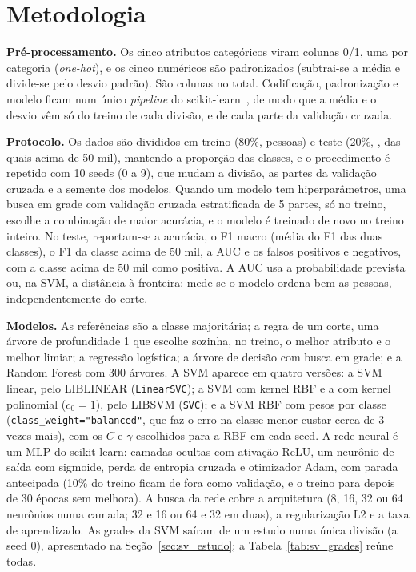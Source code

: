 \section{Metodologia}\label{sec:sv_metodo}

\textbf{Pré-processamento.} Os cinco atributos categóricos viram colunas 0/1, uma por categoria (\emph{one-hot}), e os cinco numéricos são padronizados (subtrai-se a média e divide-se pelo desvio padrão). São \svColunas{} colunas no total. Codificação, padronização e modelo ficam num único \emph{pipeline} do scikit-learn~\cite{pedregosa:11}, de modo que a média e o desvio vêm só do treino de cada divisão, e de cada parte da validação cruzada.

\textbf{Protocolo.} Os dados são divididos em treino (80\%, \svTreino{} pessoas) e teste (20\%, \svTeste, das quais \svPositivosTeste{} acima de 50 mil), mantendo a proporção das classes, e o procedimento é repetido com 10 seeds (0 a 9), que mudam a divisão, as partes da validação cruzada e a semente dos modelos. Quando um modelo tem hiperparâmetros, uma busca em grade com validação cruzada estratificada de 5 partes, só no treino, escolhe a combinação de maior acurácia, e o modelo é treinado de novo no treino inteiro. No teste, reportam-se a acurácia, o F1 macro (média do F1 das duas classes), o F1 da classe acima de 50 mil, a AUC e os falsos positivos e negativos, com a classe acima de 50 mil como positiva. A AUC usa a probabilidade prevista ou, na SVM, a distância à fronteira: mede se o modelo ordena bem as pessoas, independentemente do corte.

\textbf{Modelos.} As referências são a classe majoritária; a regra de um corte, uma árvore de profundidade 1 que escolhe sozinha, no treino, o melhor atributo e o melhor limiar; a regressão logística; a árvore de decisão com busca em grade; e a Random Forest com 300 árvores. A SVM aparece em quatro versões: a SVM linear, pelo LIBLINEAR (\texttt{LinearSVC}); a SVM com kernel RBF e a com kernel polinomial ($c_0 = 1$), pelo LIBSVM (\texttt{SVC}); e a SVM RBF com pesos por classe (\texttt{class\_weight="balanced"}, que faz o erro na classe menor custar cerca de 3 vezes mais), com os $C$ e $\gamma$ escolhidos para a RBF em cada seed. A rede neural é um MLP do scikit-learn: camadas ocultas com ativação ReLU, um neurônio de saída com sigmoide, perda de entropia cruzada e otimizador Adam, com parada antecipada (10\% do treino ficam de fora como validação, e o treino para depois de 30 épocas sem melhora). A busca da rede cobre a arquitetura (8, 16, 32 ou 64 neurônios numa camada; 32 e 16 ou 64 e 32 em duas), a regularização L2 e a taxa de aprendizado. As grades da SVM saíram de um estudo numa única divisão (a seed 0), apresentado na Seção~\ref{sec:sv_estudo}; a Tabela~\ref{tab:sv_grades} reúne todas.

